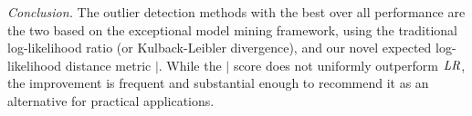 {\begin{table}
																\end{table}
																
																{\em Conclusion.} The outlier detection methods with the best over all performance are the two based on the exceptional model mining framework, using the traditional log-likelihood ratio (or Kulback-Leibler divergence), and our novel expected log-likelihood distance metric $\mid$. While the $\mid$ score does not uniformly outperform $\it{LR}$, the improvement is frequent and substantial enough to recommend it as an alternative for practical applications. 

%					


}
